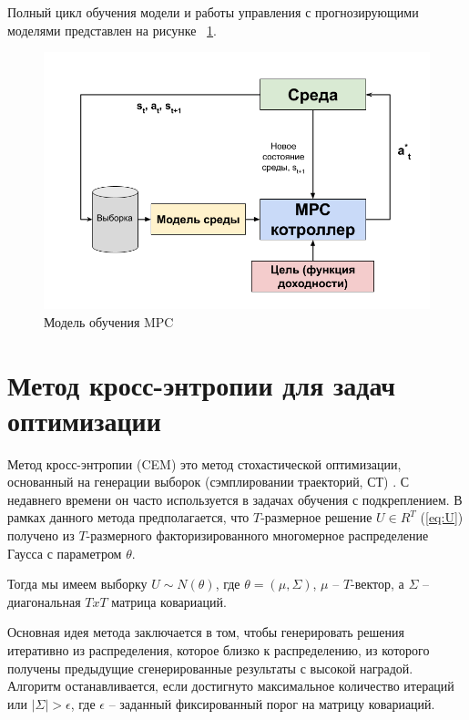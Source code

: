 Полный цикл обучения модели и работы управления с прогнозирующими моделями представлен на рисунке ~\ref{fig:mpc-m}. \newpage
 
 
 \begin{figure}[h]
 	\centering
 	\includegraphics[scale=0.6]{mpc_model.png}
 	\caption {Модель обучения MPC}
 	\label{fig:mpc-m}
 \end{figure}





\section{Метод кросс-энтропии для задач оптимизации}\label{1sec:optimal-control}

Метод кросс-энтропии (CEM) это метод стохастической оптимизации, основанный на генерации выборок (сэмплировании траекторий, СТ) \cite{cem2}. С недавнего времени он часто используется в задачах обучения с подкреплением. В рамках данного метода предполагается, что $T$-размерное решение $U \in R^T$ (\ref{eq:U}) получено из $T$-размерного факторизированного многомерное распределение Гаусса с параметром $\theta$.

Тогда мы имеем выборку $U \sim N(\theta)$, где $\theta = (\mu, \Sigma)$, $\mu$ --  $T$-вектор, а $\Sigma$ -- диагональная $T x T$ матрица ковариаций.

Основная идея метода заключается в том, чтобы генерировать решения итеративно из распределения, которое близко к распределению, из которого получены предыдущие сгенерированные результаты с высокой наградой. Алгоритм останавливается, если достигнуто максимальное количество итераций или $|\Sigma| > \epsilon$, где $\epsilon$ -- заданный фиксированный порог на матрицу ковариаций. 

